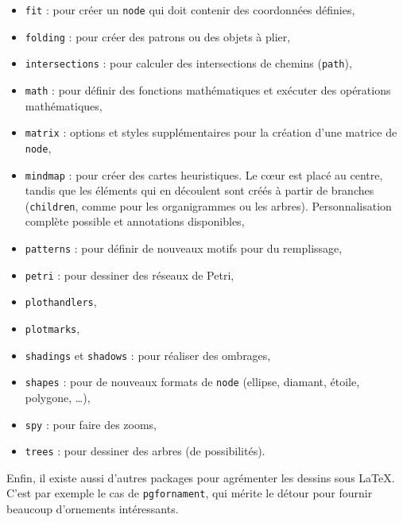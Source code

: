 \begin{itemize}[label = , itemsep = \baselineskip]
\item \verb?fit? : pour créer un \verb?node? qui doit contenir des coordonnées définies,

\item \verb?folding? : pour créer des patrons ou des objets à plier,

\item \verb?intersections? : pour calculer des intersections de chemins (\verb?path?),

\item \verb?math? : pour définir des fonctions mathématiques et exécuter des opérations mathématiques,

\item \verb?matrix? : options et styles supplémentaires pour la création d'une matrice de \verb?node?,

\item \verb?mindmap? : pour créer des cartes heuristiques. Le c{\oe}ur est placé au centre, tandis que les éléments qui en découlent sont créés à partir de branches (\verb?children?, comme pour les organigrammes ou les arbres). Personnalisation complète possible et annotations disponibles,

\item \verb?patterns? : pour définir de nouveaux motifs pour du remplissage,

\item \verb?petri? : pour dessiner des réseaux de Petri,

\item \verb?plothandlers?,

\item \verb?plotmarks?,

\item \verb?shadings? et \verb?shadows? : pour réaliser des ombrages,

\item \verb?shapes? : pour de nouveaux formats de \verb?node? (ellipse, diamant, étoile, polygone, \dots{}),

\item \verb?spy? : pour faire des zooms,

\item \verb?trees? : pour dessiner des arbres (de possibilités). \\
\end{itemize}


Enfin, il existe aussi d'autres packages pour agrémenter les dessins sous \LaTeX{}. C'est par exemple le cas de \verb?pgfornament?, qui mérite le détour pour fournir beaucoup d'ornements intéressants.

